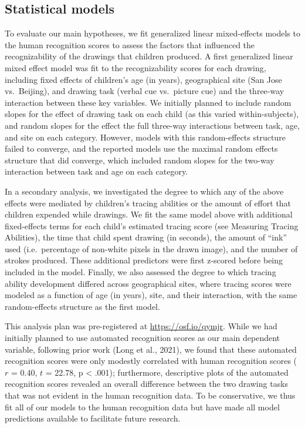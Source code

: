 \documentclass[
  man]{apa6}
\begin{document}
\hypertarget{statistical-models}{%
\subsection{Statistical models}\label{statistical-models}}

To evaluate our main hypotheses, we fit generalized linear mixed-effects models to the human recognition scores to assess the factors that influenced the recognizability of the drawings that children produced. A first generalized linear mixed effect model was fit to the recognizability scores for each drawing, including fixed effects of children's age (in years), geographical site (San Jose vs.~Beijing), and drawing task (verbal cue vs.~picture cue) and the three-way interaction between these key variables. We initially planned to include random slopes for the effect of drawing task on each child (as this varied within-subjects), and random slopes for the effect the full three-way interactions between task, age, and site on each category. However, models with this random-effects structure failed to converge, and the reported models use the maximal random effects structure that did converge, which included random slopes for the two-way interaction between task and age on each category.

In a secondary analysis, we investigated the degree to which any of the above effects were mediated by children's tracing abilities or the amount of effort that children expended while drawings.
We fit the same model above with additional fixed-effects terms for each child's estimated tracing score (see Measuring Tracing Abilities), the time that child spent drawing (in seconds), the amount of ``ink'' used (i.e.~percentage of non-white pixels in the drawn image), and the number of strokes produced.
These additional predictors were first z-scored before being included in the model.
Finally, we also assessed the degree to which tracing ability development differed across geographical sites, where tracing scores were modeled as a function of age (in years), site, and their interaction, with the same random-effects structure as the first model.

This analysis plan was pre-registered at \url{https://osf.io/qymjr}. While we had initially planned to use automated recognition scores as our main dependent variable, following prior work (Long et al., 2021), we found that these automated recognition scores were only modestly correlated with human recognition scores (\(r\) = 0.40, \(t\) = 22.78, p \textless{} .001); furthermore, descriptive plots of the automated recognition scores revealed an overall difference between the two drawing tasks that was not evident in the human recognition data. To be conservative, we thus fit all of our models to the human recognition data but have made all model predictions available to facilitate future research.
\end{document}
